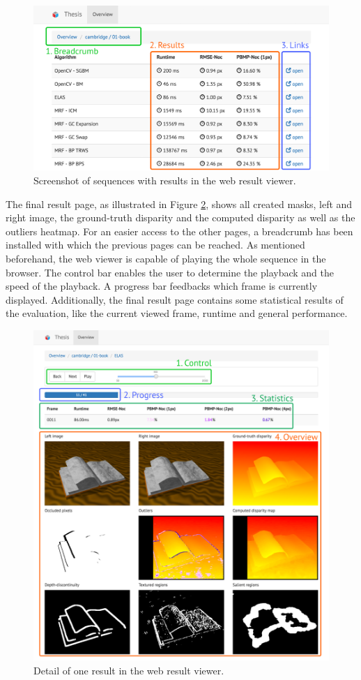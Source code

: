 \begin{figure}[h!]
  \centering
  \includegraphics[width=1.0\textwidth]{src/images/result-viewer-overview2.png}
  \caption[Screenshot of sequences in the web result viewer]{Screenshot of sequences with results in the web result viewer.}
  \label{fig:web-overview2}
\end{figure}

\noindent The final result page, as illustrated in Figure \ref{fig:web-detail}, shows all created masks, left and right image, the ground-truth disparity and the computed disparity as well as the outliers heatmap.
For an easier access to the other pages, a breadcrumb has been installed with which the previous pages can be reached.
As mentioned beforehand, the web viewer is capable of playing the whole sequence in the browser.
The control bar enables the user to determine the playback and the speed of the playback.
A progress bar feedbacks which frame is currently displayed.
Additionally, the final result page contains some statistical results of the evaluation, like the current viewed frame, runtime and general performance.

\begin{figure}[p!]
  \centering
  \includegraphics[width=1.0\textwidth]{src/images/result-viewer-detail.png}
  \caption[Detail of one result in the web result viewer]{Detail of one result in the web result viewer.}
  \label{fig:web-detail}
\end{figure}
